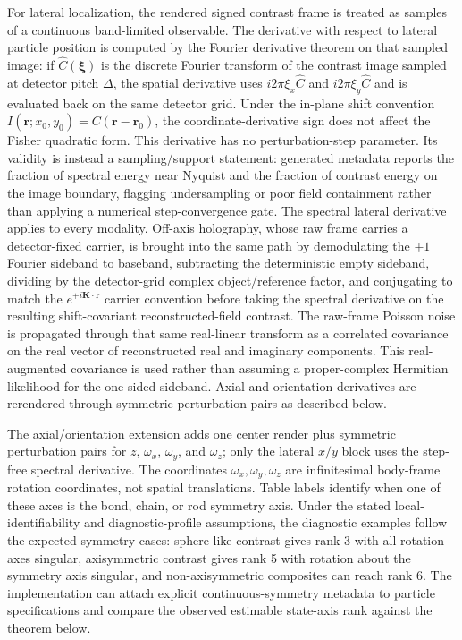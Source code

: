 For lateral localization, the rendered signed contrast frame is treated as samples of a continuous band-limited observable. The derivative with respect to lateral particle position is computed by the Fourier derivative theorem on that sampled image: if $\widehat{C}(\boldsymbol{\xi})$ is the discrete Fourier transform of the contrast image sampled at detector pitch $\Delta$, the spatial derivative uses $i2\pi\xi_x\widehat{C}$ and $i2\pi\xi_y\widehat{C}$ and is evaluated back on the same detector grid. Under the in-plane shift convention $I(\mathbf{r};x_0,y_0)=C(\mathbf{r}-\mathbf{r}_0)$, the coordinate-derivative sign does not affect the Fisher quadratic form. This derivative has no perturbation-step parameter. Its validity is instead a sampling/support statement: generated metadata reports the fraction of spectral energy near Nyquist and the fraction of contrast energy on the image boundary, flagging undersampling or poor field containment rather than applying a numerical step-convergence gate. The spectral lateral derivative applies to every modality. Off-axis holography, whose raw frame carries a detector-fixed carrier, is brought into the same path by demodulating the $+1$ Fourier sideband to baseband, subtracting the deterministic empty sideband, dividing by the detector-grid complex object/reference factor, and conjugating to match the $e^{+i\mathbf{K}\cdot\mathbf{r}}$ carrier convention before taking the spectral derivative on the resulting shift-covariant reconstructed-field contrast. The raw-frame Poisson noise is propagated through that same real-linear transform as a correlated covariance on the real vector of reconstructed real and imaginary components. This real-augmented covariance is used rather than assuming a proper-complex Hermitian likelihood for the one-sided sideband. Axial and orientation derivatives are rerendered through symmetric perturbation pairs as described below.

The axial/orientation extension adds one center render plus symmetric perturbation pairs for $z$, $\omega_x$, $\omega_y$, and $\omega_z$; only the lateral $x/y$ block uses the step-free spectral derivative. The coordinates $\omega_x,\omega_y,\omega_z$ are infinitesimal body-frame rotation coordinates, not spatial translations. Table labels identify when one of these axes is the bond, chain, or rod symmetry axis. Under the stated local-identifiability and diagnostic-profile assumptions, the diagnostic examples follow the expected symmetry cases: sphere-like contrast gives rank 3 with all rotation axes singular, axisymmetric contrast gives rank 5 with rotation about the symmetry axis singular, and non-axisymmetric composites can reach rank 6. The implementation can attach explicit continuous-symmetry metadata to particle specifications and compare the observed estimable state-axis rank against the theorem below.

